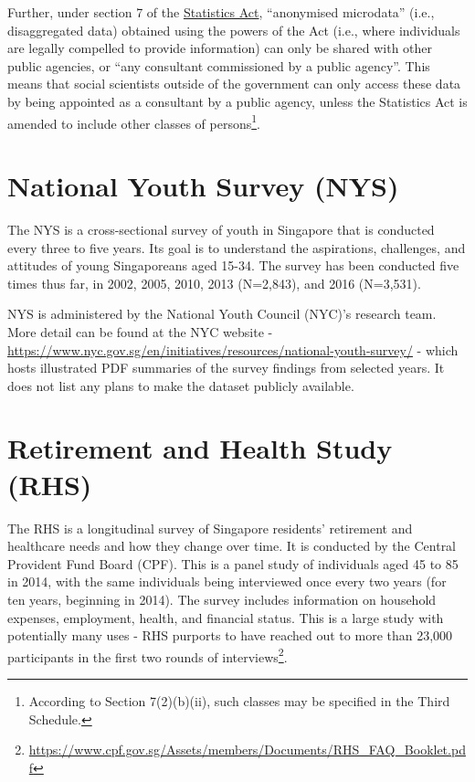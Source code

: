 \documentclass[openany]{book}
\let\rmarkdownfootnote\footnote%
\def\footnote{\protect\rmarkdownfootnote}
\begin{document}
Further, under section 7 of the
\href{https://sso.agc.gov.sg/Act/SA1973}{Statistics Act}, ``anonymised
microdata'' (i.e., disaggregated data) obtained using the powers of the
Act (i.e., where individuals are legally compelled to provide
information) can only be shared with other public agencies, or ``any
consultant commissioned by a public agency''. This means that social
scientists outside of the government can only access these data by being
appointed as a consultant by a public agency, unless the Statistics Act
is amended to include other classes of persons\footnote{According to
  Section 7(2)(b)(ii), such classes may be specified in the Third
  Schedule.}.

\section{National Youth Survey (NYS)}\label{nys}

The NYS is a cross-sectional survey of youth in Singapore that is
conducted every three to five years. Its goal is to understand the
aspirations, challenges, and attitudes of young Singaporeans aged 15-34.
The survey has been conducted five times thus far, in 2002, 2005, 2010,
2013 (N=2,843), and 2016 (N=3,531).

NYS is administered by the National Youth Council (NYC)'s research team.
More detail can be found at the NYC website -
\url{https://www.nyc.gov.sg/en/initiatives/resources/national-youth-survey/}
- which hosts illustrated PDF summaries of the survey findings from
selected years. It does not list any plans to make the dataset publicly
available.

\section{Retirement and Health Study (RHS)}\label{rhs}

The RHS is a longitudinal survey of Singapore residents' retirement and
healthcare needs and how they change over time. It is conducted by the
Central Provident Fund Board (CPF). This is a panel study of individuals
aged 45 to 85 in 2014, with the same individuals being interviewed once
every two years (for ten years, beginning in 2014). The survey includes
information on household expenses, employment, health, and financial
status. This is a large study with potentially many uses - RHS purports
to have reached out to more than 23,000 participants in the first two
rounds of interviews\footnote{\url{https://www.cpf.gov.sg/Assets/members/Documents/RHS_FAQ_Booklet.pdf}}.
\end{document}
